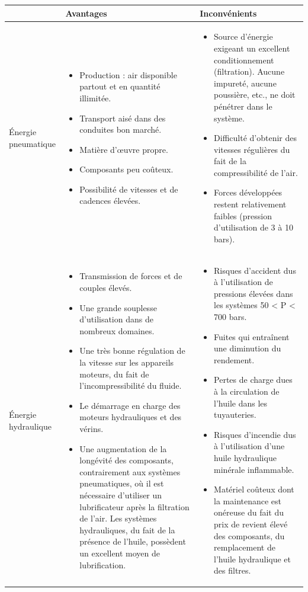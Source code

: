 \documentclass[10pt]{article}
\begin{document}
\begin{center}
\begin{tabular}{|l|p{}|p{}|}
\cline{2-3}
\multicolumn{1}{c|}{}& Avantages & Inconvénients \\
\cline{2-3}
\hline
Énergie  pneumatique &
\begin{itemize}
\item Production : air disponible partout et en quantité illimitée.
\item Transport aisé dans des conduites bon marché.
\item Matière d’œuvre propre.
\item Composants peu coûteux.
\item Possibilité de vitesses et de cadences élevées.
\end{itemize}
&
\begin{itemize}
\item Source d'énergie exigeant un excellent conditionnement (filtration). Aucune impureté, aucune poussière, etc., ne doit pénétrer dans le système.
\item Difficulté d'obtenir des vitesses régulières du fait de la compressibilité de l'air.
\item Forces développées restent relativement faibles (pression d’utilisation de 3 à 10 bars).
\end{itemize}
 \\
\hline
Énergie hydraulique & 
\begin{itemize}
\item Transmission de forces et de couples élevés.
\item Une grande souplesse d'utilisation dans de nombreux domaines.
\item Une très bonne régulation de la vitesse sur les appareils moteurs, du fait de l'incompressibilité du fluide.
\item Le démarrage en charge des moteurs hydrauliques et des vérins.
\item Une augmentation de la longévité des composants, contrairement aux systèmes pneumatiques, où il est nécessaire d'utiliser un lubrificateur après la filtration de l'air. Les systèmes hydrauliques, du fait de la présence de l'huile, possèdent un excellent moyen de lubrification.
\end{itemize}&
\begin{itemize}
\item Risques d'accident dus à l'utilisation de pressions élevées dans les systèmes 50 < P < 700 bars.
\item Fuites qui entraînent une diminution du rendement.
\item Pertes de charge dues à la circulation de l'huile dans les tuyauteries.
\item Risques d'incendie dus à l'utilisation d'une huile hydraulique minérale inflammable.
\item Matériel coûteux dont la maintenance est onéreuse du fait du prix de revient élevé des composants, du remplacement de l'huile hydraulique et des filtres.
\end{itemize}
\\
\hline
\end{tabular}
\end{center}
\end{document}
